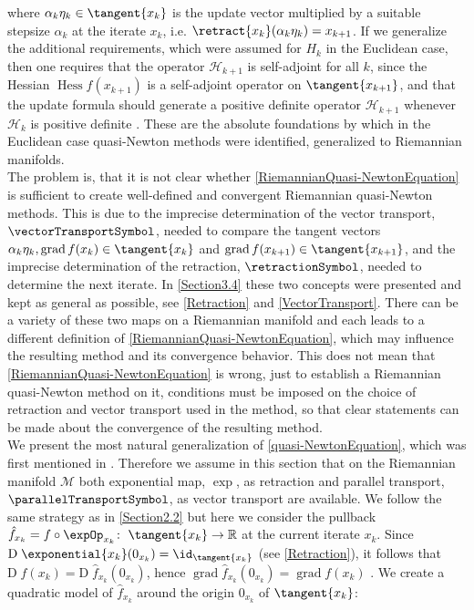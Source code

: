 where $\alpha_k \eta_k \in \tangent{x_k}$ is the update vector multiplied by a suitable stepsize $\alpha_k$ at the iterate $x_k$, i.e. $\retract{x_k}(\alpha_k \eta_k) = x_{k+1}$. If we generalize the additional requirements, which were assumed for $H_k$ in the Euclidean case, then one requires that the operator $\mathcal{H}_{k+1}$ is self-adjoint for all $k$, since the Hessian $\operatorname{Hess} f(x_{k+1})$ is a self-adjoint operator on $\tangent{x_{k+1}}$, and that the update formula should generate a positive definite operator $\mathcal{H}_{k+1}$ whenever $\mathcal{H}_k$ is positive definite \cite[p.~179]{AbsilMahonySepulchre:2008}. These are the absolute foundations by which in the Euclidean case quasi-Newton methods were identified, generalized to Riemannian manifolds. \\
The problem is, that it is not clear whether \cref{RiemannianQuasi-NewtonEquation} is sufficient to create well-defined and convergent Riemannian quasi-Newton methods. This is due to the imprecise determination of the vector transport, $\vectorTransportSymbol$, needed to compare the tangent vectors $\alpha_k \eta_k, \operatorname{grad} f(x_k) \in \tangent{x_k}$ and $\operatorname{grad} f(x_{k+1}) \in \tangent{x_{k+1}}$, and the imprecise determination of the retraction, $\retractionSymbol$, needed to determine the next iterate. In \cref{Section3.4} these two concepts were presented and kept as general as possible, see \cref{Retraction} and \cref{VectorTransport}. There can be a variety of these two maps on a Riemannian manifold and each leads to a different definition of \cref{RiemannianQuasi-NewtonEquation}, which may influence the resulting method and its convergence behavior. This does not mean that \cref{RiemannianQuasi-NewtonEquation} is wrong, just to establish a Riemannian quasi-Newton method on it, conditions must be imposed on the choice of retraction and vector transport used in the method, so that clear statements can be made about the convergence of the resulting method. \\
We present the most natural generalization of \cref{quasi-NewtonEquation}, which was first mentioned in \cite[p.~205]{Gabay:1982}. Therefore we assume in this section that on the Riemannian manifold $\mathcal{M}$ both exponential map, $\exp$, as retraction and parallel transport, $\parallelTransportSymbol$, as vector transport are available. We follow the same strategy as in \cref{Section2.2} but here we consider the pullback $\hat{f}_{x_k} = f \circ \expOp_{x_k} \colon \; \tangent{x_k} \to \mathbb{R}$ at the current iterate $x_k$. Since $\mathrm{D} \; \exponential{x_k}(0_{x_k}) = \id_{\tangent{x_k}}$ (see \cref{Retraction}), it follows that $\mathrm{D} \; f(x_k) = \mathrm{D} \; \hat{f}_{x_k}(0_{x_k})$, hence $\operatorname{grad} \hat{f}_{x_k} (0_{x_k}) = \operatorname{grad} f(x_k)$ \cite[p.~139]{AbsilMahonySepulchre:2008}. We create a quadratic model of $\hat{f}_{x_k}$ around the origin $0_{x_k}$ of $\tangent{x_k}$:
